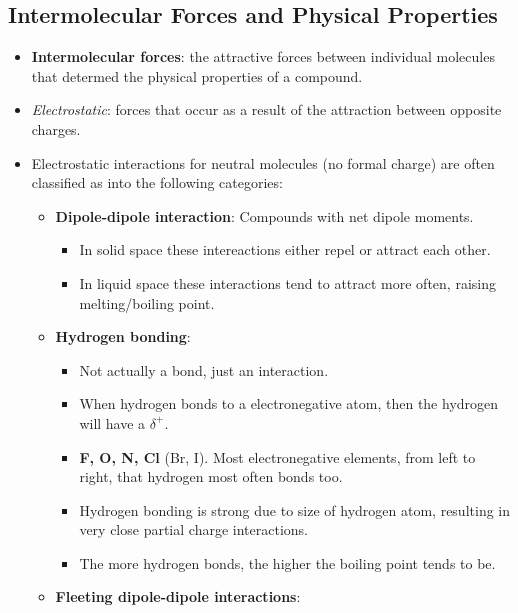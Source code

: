 \documentclass[12pt,a4paper]{article}
\begin{document}
\subsection{Intermolecular Forces and Physical Properties}
\begin{itemize}
    \item \textbf{Intermolecular forces}: the attractive forces between individual molecules that determed the physical properties of a compound.
    \item \textit{Electrostatic}: forces that occur as a result of the attraction between opposite charges. 
    \item Electrostatic interactions for neutral molecules (no formal charge) are often classified as into the following categories:
        \begin{itemize} 
            \item \textbf{Dipole-dipole interaction}: Compounds with net dipole moments. 
                \begin{itemize}
                    \item In {\color{o-Sun}solid} space these intereactions either {\color{o-Sun}repel or attract} each other.
                    \item In {\color{o-Sun}liquid} space these interactions tend to {\color{o-Sun}attract more often}, raising melting/boiling point.
                \end{itemize}
            \item \textbf{Hydrogen bonding}:
                \begin{itemize}
                    \item Not actually a bond, just an interaction.
                    \item When hydrogen bonds to a electronegative atom, then the hydrogen will have a {\color{pos}$\delta^+$}.
                    \item \textbf{F, O, N, Cl} (Br, I). Most electronegative elements, from left to right, that hydrogen most often bonds too.
                    \item Hydrogen bonding is strong due to size of hydrogen atom, resulting in very close partial charge interactions.
                    \item The {\color{o-Sun}more} hydrogen bonds, the {\color{o-Sun}higher} the boiling point tends to be.
                \end{itemize}
            \item \textbf{Fleeting dipole-dipole interactions}:

\end{itemize}
\end{itemize}
\end{document}

